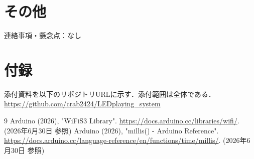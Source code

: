 \documentclass[lualatex,paper=a4paper,jafontsize=11.5pt,jafontscale=1.05]{jlreq}
\begin{document}
\section{その他}
連絡事項・懸念点：なし

\section{付録}
添付資料を以下のリポジトリURLに示す．添付範囲は全体である．\\
\url{https://github.com/crab2424/LEDplaying_system}



\begin{thebibliography}{9}
 Arduino (2026), "WiFiS3 Library". \url{https://docs.arduino.cc/libraries/wifi/}. (2026年6月30日 参照)
 Arduino (2026), "millis() - Arduino Reference". \url{https://docs.arduino.cc/language-reference/en/functions/time/millis/}. (2026年6月30日 参照)
\end{thebibliography}
\end{document}

